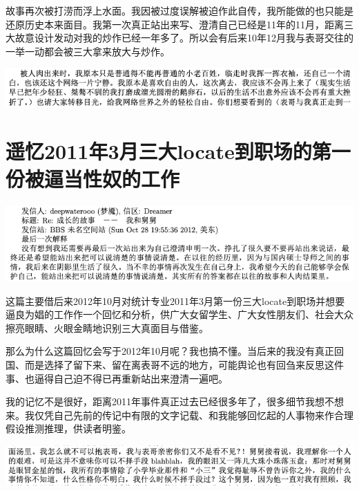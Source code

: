 \documentclass[9pt, b5paper]{article}
\begin{document}
故事再次被打涝而浮上水面。我因被过度误解被迫作此自传，我所能做的也只能是还原历史本来面目。我第一次真正站出来写、澄清自己已经是11年的11月，距离三大故意设计发动对我的炒作已经一年多了。所以会有后来10年12月我与表哥交往的一举一动都会被三大拿来放大与炒作。 

\begin{center}
\includegraphics[width=.9\linewidth]{./pic/p1p165.png}
\end{center}

\section{遥忆2011年3月三大locate到职场的第一份被逼当性奴的工作}
\label{sec:org69c18a4}

\begin{center}
\includegraphics[width=.9\linewidth]{./pic/backups_plans_p1p143-1.png.png}
\end{center}

这篇主要借后来2012年10月对统计专业2011年3月第一份三大locate到职场并想要逼良为娼的工作作一个回忆和分析，供广大女留学生、广大女性朋友们、社会大众擦亮眼睛、火眼金睛地识别三大真面目与借鉴。

那么为什么这篇回忆会写于2012年10月呢？我也搞不懂。当后来的我没有真正回国、而是选择了留下来、留在离表哥不远的地方，可能舆论也有回刍来反思这件事、也逼得自己迫不得已再重新站出来澄清一遍吧。

我的记忆不是很好，距离2011年事件真正过去已经很多年了，很多细节我想不想来。我仅凭自己先前的传记中有限的文字记载、和我能够回忆起的人事物来作合理假设推测推理，供读者明鉴。

\begin{center}
\includegraphics[width=.9\linewidth]{./pic/backups_plans_20210412_103658.png}
\end{center}
\end{document}
